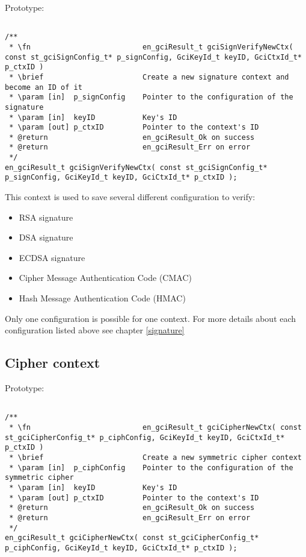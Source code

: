 Prototype:
\begin{lstlisting}

/**
 * \fn							en_gciResult_t gciSignVerifyNewCtx( const st_gciSignConfig_t* p_signConfig, GciKeyId_t keyID, GciCtxId_t* p_ctxID )
 * \brief						Create a new signature context and become an ID of it
 * \param [in]  p_signConfig	Pointer to the configuration of the signature
 * \param [in]  keyID			Key's ID
 * \param [out] p_ctxID			Pointer to the context's ID
 * @return						en_gciResult_Ok on success
 * @return						en_gciResult_Err on error
 */
en_gciResult_t gciSignVerifyNewCtx( const st_gciSignConfig_t* p_signConfig, GciKeyId_t keyID, GciCtxId_t* p_ctxID );

\end{lstlisting}

This context is used to save several different configuration to verify:
\begin{itemize}
  \item RSA signature
  \item DSA signature
  \item ECDSA signature
  \item Cipher Message Authentication Code (CMAC)
  \item Hash Message Authentication Code (HMAC)
\end{itemize}

Only one configuration is possible for one context. 
\newline
For more details about each configuration listed above see chapter
\ref{signature}

\newpage


\subsection{Cipher context}

Prototype:
\begin{lstlisting}

/**
 * \fn							en_gciResult_t gciCipherNewCtx( const st_gciCipherConfig_t* p_ciphConfig, GciKeyId_t keyID, GciCtxId_t* p_ctxID )
 * \brief						Create a new symmetric cipher context
 * \param [in]	p_ciphConfig	Pointer to the configuration of the symmetric cipher
 * \param [in]  keyID			Key's ID
 * \param [out] p_ctxID			Pointer to the context's ID
 * @return						en_gciResult_Ok on success
 * @return						en_gciResult_Err on error
 */
en_gciResult_t gciCipherNewCtx( const st_gciCipherConfig_t* p_ciphConfig, GciKeyId_t keyID, GciCtxId_t* p_ctxID );

\end{lstlisting}

